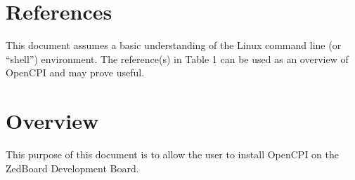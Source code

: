 \newpage

\tableofcontents

\newpage

\section{References}
	This document assumes a basic understanding of the Linux command line (or ``shell'') environment.  The reference(s) in Table 1 can be used as an overview of OpenCPI and may prove useful.
\def\refskipocpiov{}
\def\refcapbottom{}


\newpage
\section{Overview}
This purpose of this document is to allow the user to install OpenCPI on the ZedBoard Development Board.
